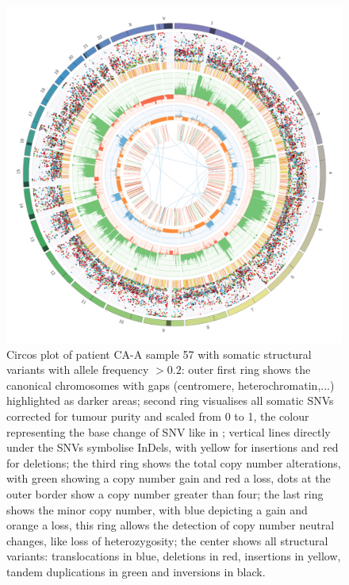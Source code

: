 \begin{figure}[!ht]
\centering
\includegraphics[width=.99\linewidth]{Figures/CASCADE/CA99/CA99-57.circos.png}
\caption[Circos plot of patient CA-A sample 57]{Circos plot of patient CA-A sample 57 with somatic structural variants with allele frequency $> 0.2$: outer first ring shows the canonical chromosomes with gaps (centromere, heterochromatin,...) highlighted as darker areas; second ring visualises all somatic SNVs corrected for tumour purity and scaled from 0 to 1, the colour representing the base change of SNV like in \protect\textcite{Alexandrov2013}; vertical lines directly under the SNVs symbolise InDels, with yellow for insertions and red for deletions; the third ring shows the total copy number alterations, with green showing a copy number gain and red a loss, dots at the outer border show a copy number greater than four; the last ring shows the minor copy number, with blue depicting a gain and orange a loss, this ring allows the detection of copy number neutral changes, like loss of heterozygosity; the center shows all structural variants: translocations in blue, deletions in red, insertions in yellow, tandem duplications in green and inversions in black.} \label{fig:ca99.57circos}
\end{figure}


